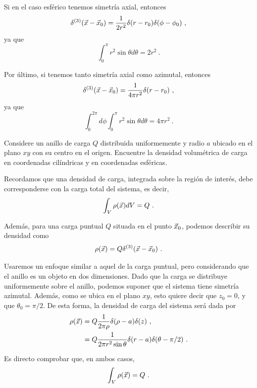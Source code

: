 Si en el caso esférico tenemos simetría axial, entonces
\begin{align*}
    \delta^{(3)}(\vec{x} - \vec{x}_0) = \frac{1}{2r^2} \delta(r - r_0) \delta(\phi - \phi_0) \ ,
\end{align*}
ya que
\begin{equation*}
    \int_0^\pi r^2 \sin \theta d\theta = 2r^2 \ .
\end{equation*}

Por último, si tenemos tanto simetría axial como azimutal, entonces
\begin{align*}
    \delta^{(3)}(\vec{x} - \vec{x}_0) = \frac{1}{4\pi r^2} \delta(r - r_0) \ ,
\end{align*}
ya que
\begin{equation*}
    \int_0^{2\pi} d\phi \int_0^\pi r^2 \sin \theta d\theta = 4\pi r^2 \ .
\end{equation*}

\begin{ejemplo}
    Considere un anillo de carga $Q$ distribuida uniformemente y radio $a$ ubicado en el plano $xy$ con su centro en el origen. Encuentre la densidad volumétrica de carga en coordenadas cilíndricas y en coordenadas esféricas.

    Recordamos que una densidad de carga, integrada sobre la región de interés, debe corresponderse con la carga total del sistema, es decir,
    \begin{equation*}
        \int_V \rho(\vec{x}) dV = Q \ .
    \end{equation*}

    Además, para una carga puntual $Q$ situada en el punto $\vec{x}_0$, podemos describir su densidad como
    \begin{equation*}
        \rho(\vec{x}) = Q \delta^{(3)}(\vec{x}-\vec{x}_0) \ .
    \end{equation*}

    Usaremos un enfoque similar a aquel de la carga puntual, pero considerando que el anillo es un objeto en dos dimensiones. Dado que la carga se distribuye uniformemente sobre el anillo, podemos suponer que el sistema tiene simetría azimutal. Además, como se ubica en el plano $xy$, esto quiere decir que $z_0 = 0$, y que $\theta_0 = \pi/2$. De esta forma, la densidad de carga del sistema será dada por
    \begin{align*}
        \rho(\vec{x}) & = Q \frac{1}{2\pi \rho} \delta(\rho - a) \delta(z) \ , \\
        & = Q \frac{1}{2\pi r^2 \sin\theta} \delta(r-a) \delta(\theta - \pi/2) \ .
    \end{align*}
    
    Es directo comprobar que, en ambos casos,
    \begin{equation*}
        \int_V \rho(\vec{x}) = Q \ .
    \end{equation*}
\end{ejemplo}

